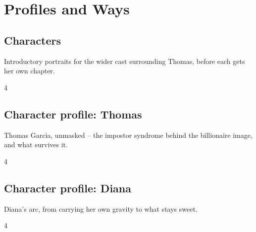 \documentclass[a4paper,landscape]{memoir}
\begin{document}
\part{Profiles and Ways}
\chapter{Characters}
Introductory portraits for the wider cast surrounding Thomas, before each gets her own chapter.
\clearpage\begin{multicols*}{4}
\end{multicols*}

\chapter{Character profile: Thomas}
Thomas Garcia, unmasked -- the impostor syndrome behind the billionaire image, and what survives it.
\clearpage\begin{multicols*}{4}





\end{multicols*}

\chapter{Character profile: Diana}
Diana's arc, from carrying her own gravity to what stays sweet.
\clearpage\begin{multicols*}{4}
\end{multicols*}
\end{document}
